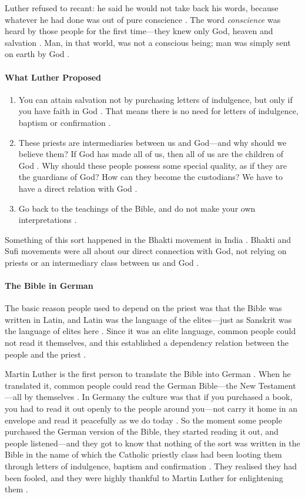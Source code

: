Luther refused to recant: he said he would not take back his words, because whatever he had done was out of pure conscience . The word \textit{conscience} was heard by those people for the first time---they knew only God, heaven and salvation . Man, in that world, was not a conscious being; man was simply sent on earth by God .

\paragraph{What Luther Proposed}
\begin{enumerate}
    \item You can attain salvation not by purchasing letters of indulgence, but only if you have faith in God . That means there is no need for letters of indulgence, baptism or confirmation .
    \item These priests are intermediaries between us and God---and why should we believe them? If God has made all of us, then all of us are the children of God . Why should these people possess some special quality, as if they are the guardians of God? How can they become the custodians? We have to have a direct relation with God .
    \item Go back to the teachings of the Bible, and do not make your own interpretations .
\end{enumerate}

\begin{ComparisonBox}
Something of this sort happened in the Bhakti movement in India . Bhakti and Sufi movements were all about our direct connection with God, not relying on priests or an intermediary class between us and God .
\end{ComparisonBox}

\paragraph{The Bible in German}
The basic reason people used to depend on the priest was that the Bible was written in Latin, and Latin was the language of the elites---just as Sanskrit was the language of elites here . Since it was an elite language, common people could not read it themselves, and this established a dependency relation between the people and the priest .

Martin Luther is the first person to translate the Bible into German . When he translated it, common people could read the German Bible---the New Testament---all by themselves .
In Germany the culture was that if you purchased a book, you had to read it out openly to the people around you---not carry it home in an envelope and read it peacefully as we do today .
So the moment some people purchased the German version of the Bible, they started reading it out, and people listened---and they got to know that nothing of the sort was written in the Bible in the name of which the Catholic priestly class had been looting them through letters of indulgence, baptism and confirmation . They realised they had been fooled, and they were highly thankful to Martin Luther for enlightening them .

